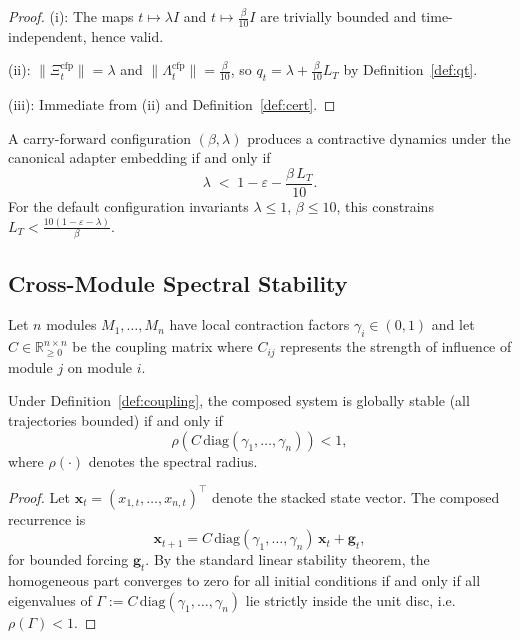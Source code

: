 \documentclass[11pt]{article}
\begin{document}
\begin{proof}
(i): The maps $t\mapsto\lambda I$ and $t\mapsto\tfrac{\beta}{10}I$
are trivially bounded and time-independent, hence valid.

(ii): $\|\Xi_{t}^{\mathrm{cfp}}\|=\lambda$ and
$\|\Lambda_{t}^{\mathrm{cfp}}\|=\tfrac{\beta}{10}$,
so $q_{t}=\lambda+\tfrac{\beta}{10}L_{T}$ by Definition~\ref{def:qt}.

(iii): Immediate from (ii) and Definition~\ref{def:cert}.
\end{proof}

\begin{corollary}
\label{cor:cfpcrit}
A carry-forward configuration $(\beta,\lambda)$ produces
a contractive dynamics under the canonical adapter embedding if and only if
\[
\lambda \;<\; 1 - \varepsilon - \frac{\beta\,L_{T}}{10}.
\]
For the default configuration invariants
$\lambda\leq 1$, $\beta\leq 10$, this constrains
$L_{T} < \tfrac{10(1-\varepsilon-\lambda)}{\beta}$.
\end{corollary}

\subsection{Cross-Module Spectral Stability}
\label{sec:spectral}

\begin{definition}
\label{def:coupling}
Let $n$ modules $M_{1},\dots,M_{n}$ have local
contraction factors $\gamma_{i}\in(0,1)$ and
let $C\in\mathbb{R}^{n\times n}_{\geq 0}$
be the coupling matrix where $C_{ij}$ represents
the strength of influence of module $j$ on module $i$.
\end{definition}

\begin{theorem}
\label{thm:crossmod}
Under Definition~\ref{def:coupling},
the composed system is globally stable
(all trajectories bounded) if and only if
\[
\rho\!\left(C\,\mathrm{diag}(\gamma_{1},\dots,\gamma_{n})\right) < 1,
\]
where $\rho(\cdot)$ denotes the spectral radius.
\end{theorem}

\begin{proof}
Let $\mathbf{x}_{t}=(x_{1,t},\dots,x_{n,t})^{\top}$
denote the stacked state vector.
The composed recurrence is
\[
\mathbf{x}_{t+1} = C\,\mathrm{diag}(\gamma_1,\dots,\gamma_n)\,\mathbf{x}_{t}
                 + \mathbf{g}_{t},
\]
for bounded forcing $\mathbf{g}_{t}$.
By the standard linear stability theorem,
the homogeneous part converges to zero for all initial conditions
if and only if all eigenvalues of
$\Gamma := C\,\mathrm{diag}(\gamma_{1},\dots,\gamma_{n})$
lie strictly inside the unit disc, i.e.\ $\rho(\Gamma)<1$.
\end{proof}
\end{document}

